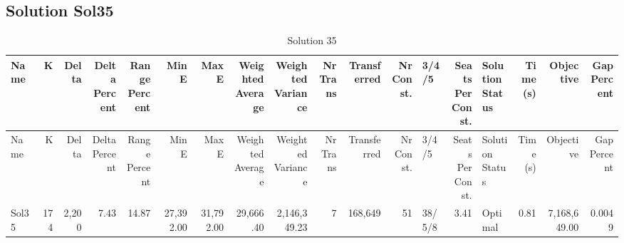 \documentclass[a4paper]{article}
\begin{document}
\clearpage
\subsection{Solution Sol35}

{\scriptsize
\begin{longtable}{lrrrrrrrrrrrlrlrrr}
\caption{Solution 35}
\\ \toprule
Name &K &Delta &\shortstack{Delta\\Percent} &\shortstack{Range\\Percent} &Min E &Max E &\shortstack{Weighted\\Average} &\shortstack{Weighted\\Variance} &\shortstack{Nr\\Trans} &Transferred &\shortstack{Nr\\Const.} &3/4/5 &\shortstack{Seats\\Per\\Const.} &\shortstack{Solution\\Status} &\shortstack{Time\\(s)} &Objective &\shortstack{Gap\\Percent} \\ \midrule
\endfirsthead
\toprule
Name &K &Delta &\shortstack{Delta\\Percent} &\shortstack{Range\\Percent} &Min E &Max E &\shortstack{Weighted\\Average} &\shortstack{Weighted\\Variance} &\shortstack{Nr\\Trans} &Transferred &\shortstack{Nr\\Const.} &3/4/5 &\shortstack{Seats\\Per\\Const.} &\shortstack{Solution\\Status} &\shortstack{Time\\(s)} &Objective &\shortstack{Gap\\Percent} \\ \midrule
\endhead
\bottomrule
\endfoot
Sol35&174&2,200& 7.43&14.87&27,392.00&31,792.00&29,666.40&2,146,349.23&7&168,649&51&38/5/8& 3.41&Optimal& 0.81&7,168,649.00&0.0049\\ 
\end{longtable}

}
\end{document}
